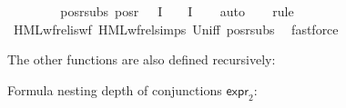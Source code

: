 \begin{isabellebody}
\ \ \ \ \isamarkupfalse%
\isanewline
\ \ \isamarkupfalse%
\isanewline
{}\isamarkupfalse%
%
\endisatagproof
{\isafoldproof}%
%
\isadelimproof
\isanewline
%
\endisadelimproof
\isanewline
{}\isamarkupfalse%
\ pos{\isacharunderscore}{\kern0pt}r{\isacharunderscore}{\kern0pt}subs{\isacharcolon}{\kern0pt}\ {\isachardoublequoteopen}pos{\isacharunderscore}{\kern0pt}r\ {\isacharparenleft}{\kern0pt}{\isasymPhi}\ {\isacharbackquote}{\kern0pt}\ I{\isacharparenright}{\kern0pt}\ {\isasymsubseteq}\ {\isacharparenleft}{\kern0pt}{\isasymPhi}\ {\isacharbackquote}{\kern0pt}\ I{\isacharparenright}{\kern0pt}{\isachardoublequoteclose}\isanewline
%
\isadelimproof
\ \ %
\endisadelimproof
%
\isatagproof
{}\isamarkupfalse%
\ auto%
\endisatagproof
{\isafoldproof}%
%
\isadelimproof
\isanewline
%
\endisadelimproof
\isanewline
{}\isamarkupfalse%
\isanewline
%
\isadelimproof
\ \ %
\endisadelimproof
%
\isatagproof
{}\isamarkupfalse%
\ rule\isanewline
\ \ \isamarkupfalse%
\ HML{\isacharunderscore}{\kern0pt}wf{\isacharunderscore}{\kern0pt}rel{\isacharunderscore}{\kern0pt}is{\isacharunderscore}{\kern0pt}wf\ HML{\isacharunderscore}{\kern0pt}wf{\isacharunderscore}{\kern0pt}rel{\isachardot}{\kern0pt}simps\ Un{\isacharunderscore}{\kern0pt}iff\ pos{\isacharunderscore}{\kern0pt}r{\isacharunderscore}{\kern0pt}subs\ \isamarkupfalse%
\ fastforce{\isacharplus}{\kern0pt}%
\endisatagproof
{\isafoldproof}%
%
\isadelimproof
%
\endisadelimproof
%
\begin{isamarkuptext}%
The other functions are also defined recursively:

Formula nesting depth of conjunctions $\textsf{expr}_2$:


\end{isamarkuptext}
\end{isabellebody}

